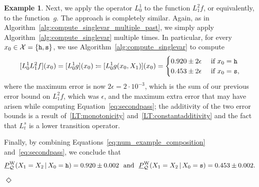 \documentclass[10pt,a4paper]{paper}
\theoremstyle{definition}
\newtheorem{exmp}{Example}%
\newcommand{\states}{\mathcal{X}}
\newcommand{\rateset}{\mathcal{Q}}
\newcommand{\coloneqq}{:\!=}
\newcommand{\exampleend}{\hfill$\Diamond$}
\begin{document}
\begin{exmp}
Next, we apply the operator $L_0^1$ to the function $L_1^2f$, or equivalently, to the function~$g$. The approach is completely similar. Again, as in Algorithm~\ref{alg:compute_singlevar_multiple_past}, we simply apply Algorithm~\ref{alg:compute_singlevar} multiple times. In particular, for every $x_0\in\states=\{{\tt h},{\tt s}\}$, we use Algorithm~\ref{alg:compute_singlevar} to compute
\begin{equation}\label{eq:secondpass}
[L_0^1L_1^2f](x_0)
=[L_0^1g](x_0)
\coloneqq
[L_0^1 g(x_0,X_1)](x_0)
=
\begin{cases}
0.920\pm2\epsilon
&\text{ if $x_0={\tt h}$}\\
0.453\pm2\epsilon
&\text{ if $x_0={\tt s}$},
\end{cases}
\end{equation}
where the maximum error is now $2\epsilon=2\cdot10^{-3}$, which is the sum of our previous error bound on $L_1^2f$, which was $\epsilon$, and the maximum extra error that may have arisen while computing Equation~\eqref{eq:secondpass}; the additivity of the two error bounds is a result of~\ref{LT:monotonicity} and~\ref{LT:constantadditivity} and the fact that $L_t^s$ is a lower transition operator.

Finally, by combining Equations~\eqref{eq:num_example_composition} and~\eqref{eq:secondpass}, we conclude that
\begin{align*}
\underline{P}_{\rateset}^{\mathrm{W}}(X_1 = X_2\,\vert\,X_0=\text{{\tt h}})=0.920\pm0.002~~\text{and}~~\underline{P}_{\rateset}^{\mathrm{W}}(X_1 = X_2\,\vert\,X_0=\text{{\tt s}})=0.453\pm0.002.
\end{align*}
\exampleend
\end{exmp}
\end{document}
